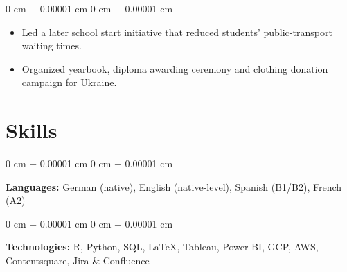 \documentclass[10pt, letterpaper]{article}
\newenvironment{highlights}{
    \setlength{\leftmargini}{2em}
    \begin{itemize}[
        topsep=0.10 cm,
        parsep=0.10 cm,
        partopsep=0pt,
        itemsep=0pt,
        leftmargin=2em
    ]
}{
    \end{itemize}
} %
\newenvironment{onecolentry}{
    \begin{adjustwidth}{
        0 cm + 0.00001 cm
    }{
        0 cm + 0.00001 cm
    }
}{
    \end{adjustwidth}
} %
\begin{document}
        \vspace{0.05 cm}
        \begin{onecolentry}
            \begin{highlights}
                \item Led a later school start initiative that reduced students' public-transport waiting times.
                \item Organized yearbook, diploma awarding ceremony and clothing donation campaign for Ukraine.
            \end{highlights}
        \end{onecolentry}

        \vspace{0.2 cm}



    
    \section{Skills}



        
        \begin{onecolentry}
            \textbf{Languages:} German (native), English (native-level), Spanish (B1/B2), French (A2)
        \end{onecolentry}

        \vspace{0.2 cm}

        \begin{onecolentry}
            \textbf{Technologies:} R, Python, SQL, LaTeX, Tableau, Power BI, GCP, AWS, Contentsquare, Jira \& Confluence
        \end{onecolentry}


    
\end{document}
